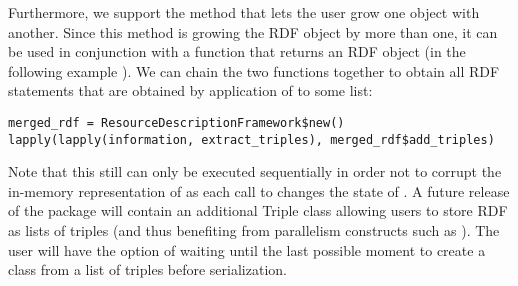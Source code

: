 Furthermore, we support the  method that lets the user grow one  object with another. Since this method is growing the RDF object by more than one, it can be used in conjunction with a function that returns an RDF object (in the following example ). We can chain the two functions together to obtain all RDF statements that are obtained by application of  to some list:

\begin{lstlisting}[style=customr]
merged_rdf = ResourceDescriptionFramework$new()
lapply(lapply(information, extract_triples), merged_rdf$add_triples)
\end{lstlisting}

Note that this still can only be executed sequentially in order not to corrupt the in-memory representation of  as each call to  changes the state of . A future release of the package will contain an additional Triple class allowing users to store RDF as lists of triples (and thus benefiting from parallelism constructs such as ). The user will have the option of waiting until the last possible moment to create a  class from a list of triples before serialization.